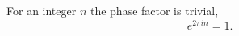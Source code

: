 \documentclass{article}
\begin{document}
For an integer $n$ the phase factor is trivial,
\begin{equation}
e^{2\pi i n} = 1 .
\label{eq:s}
\end{equation}
\end{document}
